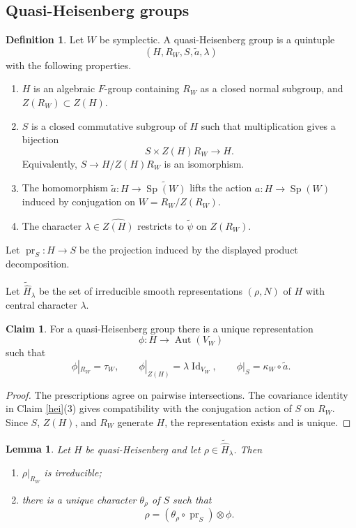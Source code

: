 \documentclass[11pt,a4paper,twoside]{amsart}
\newtheorem{lemma}[theorem]{Lemma}
\theoremstyle{definition}
\newtheorem{definition}[theorem]{Definition}
\newtheorem{claim}[theorem]{Claim}
\theoremstyle{remark}
\newcommand{\bl}{\lambda}
\newcommand{\kk}{\kappa}
\newcommand{\Aut}{\operatorname{Aut}}
\newcommand{\Sp}{\operatorname{Sp}}
\newcommand{\Id}{\operatorname{Id}}
\begin{document}
\subsection{Quasi-Heisenberg groups}
\begin{definition}\label{qH}
Let $W$ be symplectic. A quasi-Heisenberg group is a quintuple
$$
(H,R_W,S,\widetilde a,\bl)
$$
with the following properties.
\begin{enumerate}
\item $H$ is an algebraic $F$-group containing $R_W$ as a closed normal subgroup, and $Z(R_W)\subset Z(H)$.
\item $S$ is a closed commutative subgroup of $H$ such that multiplication gives a bijection
$$
S\times Z(H)R_W\longrightarrow H.
$$
Equivalently, $S\to H/Z(H)R_W$ is an isomorphism.
\item The homomorphism $\widetilde a:H\to\widetilde{\Sp(W)}$ lifts the action $a:H\to\Sp(W)$ induced by conjugation on $W=R_W/Z(R_W)$.
\item The character $\bl\in\widehat{Z(H)}$ restricts to $\widetilde\psi$ on $Z(R_W)$.
\end{enumerate}
Let $\operatorname{pr}_S:H\to S$ be the projection induced by the displayed product decomposition.
\end{definition}
Let $\widetilde{\widehat H}_\bl$ be the set of irreducible smooth representations $(\rho,N)$ of $H$ with central character $\bl$.
\begin{claim}\label{qH-phi}
For a quasi-Heisenberg group there is a unique representation
$$
\phi:H\longrightarrow\Aut(V_W)
$$
such that
$$
\phi|_{R_W}=\tau_W,\qquad \phi|_{Z(H)}=\bl\Id_{V_W},\qquad \phi|_S=\kk_W\circ\widetilde a.
$$
\end{claim}
\begin{proof}
The prescriptions agree on pairwise intersections. The covariance identity in Claim \ref{hei}(3) gives compatibility with the conjugation action of $S$ on $R_W$. Since $S$, $Z(H)$, and $R_W$ generate $H$, the representation exists and is unique.
\end{proof}
\begin{lemma}\label{thet}
Let $H$ be quasi-Heisenberg and let $\rho\in\widetilde{\widehat H}_\bl$. Then
\begin{enumerate}
\item $\rho|_{R_W}$ is irreducible;
\item there is a unique character $\theta_\rho$ of $S$ such that
$$
\rho=(\theta_\rho\circ\operatorname{pr}_S)\otimes\phi.
$$
\end{enumerate}
\end{lemma}
\end{document}
